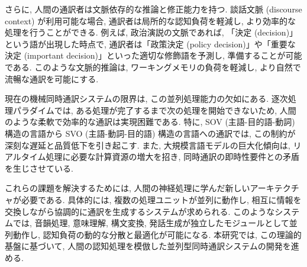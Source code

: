 さらに, 人間の通訳者は文脈依存的な推論と修正能力を持つ.
談話文脈 (discourse context) が利用可能な場合, 通訳者は局所的な認知負荷を軽減し, より効率的な処理を行うことができる.
例えば, 政治演説の文脈であれば, 「決定 (decision)」という語が出現した時点で, 通訳者は「政策決定 (policy decision)」や「重要な決定 (important decision)」といった適切な修飾語を予測し, 準備することが可能である.
このような文脈的推論は, ワーキングメモリの負荷を軽減し, より自然で流暢な通訳を可能にする.

現在の機械同時通訳システムの限界は, この並列処理能力の欠如にある.
逐次処理パラダイムでは, ある処理が完了するまで次の処理を開始できないため, 人間のような柔軟で効率的な通訳は実現困難である.
特に, SOV (主語-目的語-動詞) 構造の言語から SVO (主語-動詞-目的語) 構造の言語への通訳では, この制約が深刻な遅延と品質低下を引き起こす.
また, 大規模言語モデルの巨大化傾向は, リアルタイム処理に必要な計算資源の増大を招き, 同時通訳の即時性要件との矛盾を生じさせている.

これらの課題を解決するためには, 人間の神経処理に学んだ新しいアーキテクチャが必要である.
具体的には, 複数の処理ユニットが並列に動作し, 相互に情報を交換しながら協調的に通訳を生成するシステムが求められる.
このようなシステムでは, 音韻処理, 意味理解, 構文変換, 発話生成が独立したモジュールとして並列動作し, 認知負荷の動的な分散と最適化が可能になる.
本研究では, この理論的基盤に基づいて, 人間の認知処理を模倣した並列型同時通訳システムの開発を進める.

